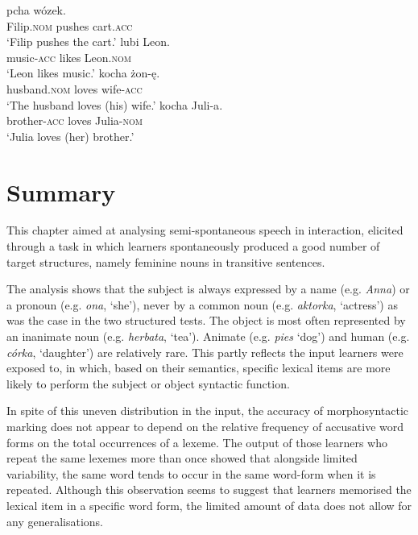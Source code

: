 \ea%
    \label{ex:07:11}
    \ea\label{ex:07:11a}
        {pcha}    {wózek}.\\
            Filip\textsc{.nom}  pushes  cart\textsc{.acc}\\
    \glt    ‘Filip pushes the cart.’
    \ex\label{ex:07:11b}
      {lubi}  {Leon}.\\
            music-\textsc{acc}  likes  Leon\textsc{.nom}\\
    \glt    ‘Leon likes music.’
    \ex\label{ex:07:11c}
          {kocha}  {żon-ę}.\\
            husband\textsc{.nom}  loves  wife-\textsc{acc}\\
    \glt    ‘The husband loves (his) wife.’
    \ex\label{ex:07:11d}
        {kocha}  {Juli-a}.\\
            brother-\textsc{acc}  loves  Julia-\textsc{nom}\\
    \glt    ‘Julia loves (her) brother.’
    \z
\z

\section{Summary}\label{sec:07:6}

This chapter aimed at analysing semi-spontaneous speech in interaction, elicited through a task in which learners spontaneously produced a good number of target structures, namely feminine nouns in transitive sentences.

The analysis shows that the subject is always expressed by a name (e.g. \textit{Anna}) or a pronoun (e.g. \textit{ona}, ‘she’), never by a common noun (e.g. \textit{aktorka}, ‘actress’) as was the case in the two structured tests. The object is most often represented by an inanimate noun (e.g. \textit{herbata}, ‘tea’). Animate (e.g. \textit{pies} ‘dog’) and human (e.g. \textit{córka}, ‘daughter’) are relatively rare. This partly reflects the input learners were exposed to, in which, based on their semantics, specific lexical items are more likely to perform the subject or object syntactic function.

In spite of this uneven distribution in the input, the accuracy of morphosyntactic marking does not appear to depend on the relative frequency of accusative word forms on the total occurrences of a lexeme. The output of those learners who repeat the same lexemes more than once showed that alongside limited variability, the same word tends to occur in the same word-form when it is repeated. Although this observation seems to suggest that learners memorised the lexical item in a specific word form, the limited amount of data does not allow for any generalisations.

